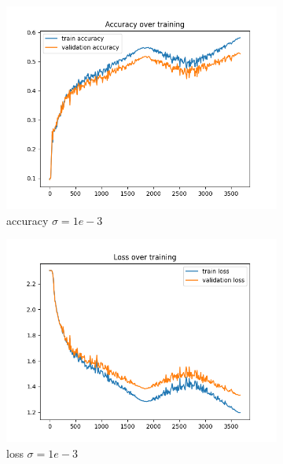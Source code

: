 \documentclass[a4paper]{article}
\begin{document}
\begin{figure}[h]
	\begin{subfigure}{0.3\textwidth}
		\centering
		\includegraphics[width=\linewidth]{images/sens_sigma_0.001_use_bn_True_acc.png}
		\caption{accuracy $\sigma=1e-3$}
	\end{subfigure}
	\begin{subfigure}{0.3\textwidth}
		\centering
		\includegraphics[width=\linewidth]{images/sens_sigma_0.001_use_bn_True_loss.png}
		\caption{loss $\sigma=1e-3$}
	\end{subfigure}
	\begin{subfigure}{0.3\textwidth}
		\centering

\end{subfigure}
\end{figure}
\end{document}
